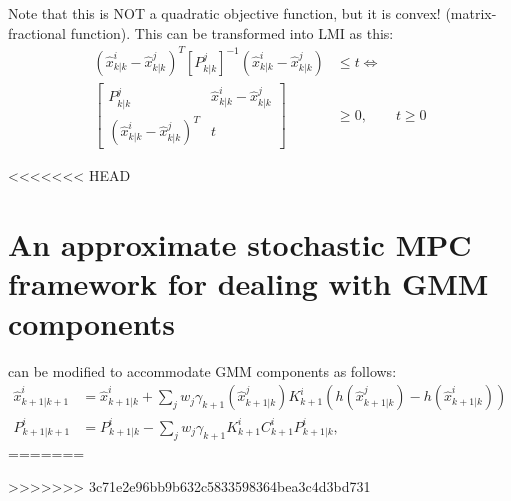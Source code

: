\documentclass[letterpaper, 10 pt, conference]{ieeeconf}  %
\begin{document}
Note that this is NOT a quadratic objective function, but it is convex! (matrix-fractional function).
This can be transformed into LMI as this:
\begin{align*}
(\hat{x}^i_{k|k}-\hat{x}^j_{k|k})^T[P^j_{k|k}]^{-1}(\hat{x}^i_{k|k}-\hat{x}^j_{k|k})&\leq t \iff\\
\begin{bmatrix}
P^j_{k|k} & \hat{x}^i_{k|k}-\hat{x}^j_{k|k}\\
(\hat{x}^i_{k|k}-\hat{x}^j_{k|k})^T & t
\end{bmatrix}&\geq 0,\qquad t\geq 0
\end{align*}

<<<<<<< HEAD
\section{An approximate stochastic MPC framework for dealing with GMM components}
 can be modified to accommodate GMM components as follows:
\begin{align}
\hat{x}^i_{k+1|k+1}&=\hat{x}^i_{k+1|k}+\sum\limits_j w_j\gamma_{k+1}(\hat{x}^j_{k+1|k})K^i_{k+1}(h(\hat{x}^j_{k+1|k})-h(\hat{x}^i_{k+1|k}))\label{subeqn:upd_mean_gmm}\\
P^i_{k+1|k+1}&=P^i_{k+1|k}-\sum\limits_j w_j\gamma_{k+1}K^i_{k+1}C^i_{k+1}P^i_{k+1|k}\label{subeqn:upd_cov_gmm},
\end{align}
=======


>>>>>>> 3c71e2e96bb9b632c5833598364bea3c4d3bd731
\end{document}
